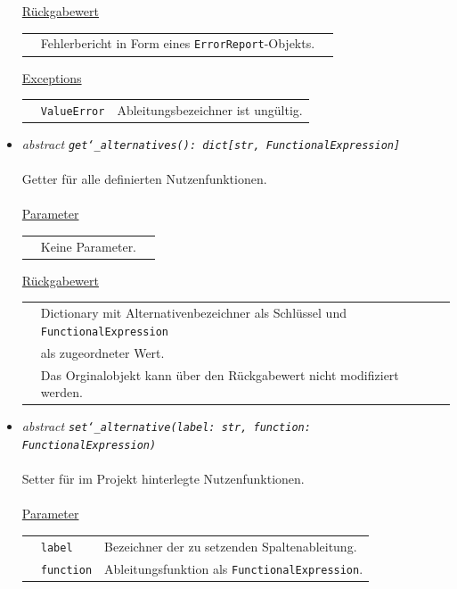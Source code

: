\documentclass{article}
\begin{document}
\begin{itemize}
\underline{Rückgabewert}\\
\begin{tabular}{lll}
 & Fehlerbericht in Form eines \texttt{ErrorReport}-Objekts.\\
\end{tabular}

\underline{Exceptions}\\
\begin{tabular}{lll}
 & \texttt{ValueError} & Ableitungsbezeichner ist ungültig.\\
\end{tabular}


\item \textit{\flqq{}abstract\frqq} \texttt{\textit{get\char`_alternatives(): dict[str, FunctionalExpression]}}\\\\
Getter für alle definierten Nutzenfunktionen.
\\\\
\underline{Parameter}\\
\begin{tabular}{lll}
 & Keine Parameter.\\
\end{tabular}

\underline{Rückgabewert}\\
\begin{tabular}{lll}
 & Dictionary mit Alternativenbezeichner als Schlüssel und \texttt{FunctionalExpression}\\
 & als zugeordneter Wert.\\
 & Das Orginalobjekt kann über den Rückgabewert nicht modifiziert werden.\\
\end{tabular}



\item \textit{\flqq{}abstract\frqq} \texttt{\textit{set\char`_alternative(label: str, function: FunctionalExpression)}}\\\\
Setter für im Projekt hinterlegte Nutzenfunktionen.
\\\\
\underline{Parameter}\\
\begin{tabular}{lll}
 & \texttt{label} & Bezeichner der zu setzenden Spaltenableitung.\\
 & \texttt{function} & Ableitungsfunktion als \texttt{FunctionalExpression}.\\
\end{tabular}


\end{itemize}
\end{document}
